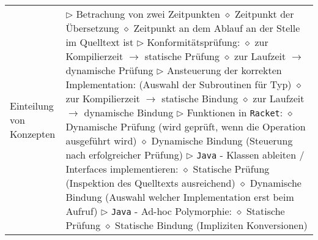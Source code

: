 \begin{tabular}{ | p{} p{} | }
	\makecell[l]{Einteilung von \\ Konzepten} & \makecell[l]{
	$\triangleright$ Betrachung von zwei Zeitpunkten \\
	\hspace{0.4cm} $\diamond$ Zeitpunkt der Übersetzung \\
	\hspace{0.4cm} $\diamond$ Zeitpunkt an dem Ablauf an der Stelle im Quelltext ist \\
	$\triangleright$ Konformitätsprüfung: \\
	\hspace{0.4cm} $\diamond$ zur Kompilierzeit $\rightarrow$ statische Prüfung \\
	\hspace{0.4cm} $\diamond$ zur Laufzeit $\rightarrow$ dynamische Prüfung \\
	$\triangleright$ Ansteuerung der korrekten Implementation: (Auswahl der Subroutinen für Typ)\\
	\hspace{0.4cm} $\diamond$ zur Kompilierzeit $\rightarrow$ statische Bindung \\
	\hspace{0.4cm} $\diamond$ zur Laufzeit $\rightarrow$ dynamische Bindung \\
	$\triangleright$ Funktionen in \texttt{Racket}: \\
	\hspace{0.4cm} $\diamond$ Dynamische Prüfung (wird geprüft, wenn die Operation ausgeführt wird) \\
	\hspace{0.4cm} $\diamond$ Dynamische Bindung (Steuerung nach erfolgreicher Prüfung) \\
	$\triangleright$ \texttt{Java} - Klassen ableiten / Interfaces implementieren: \\
	\hspace{0.4cm} $\diamond$ Statische Prüfung (Inspektion des Quelltexts ausreichend) \\
	\hspace{0.4cm} $\diamond$ Dynamische Bindung (Auswahl welcher Implementation erst beim Aufruf) \\
	$\triangleright$ \texttt{Java} - Ad-hoc Polymorphie: \\
	\hspace{0.4cm} $\diamond$ Statische Prüfung \\
	\hspace{0.4cm} $\diamond$ Statische Bindung (Impliziten Konversionen) \\
}
\end{tabular}
